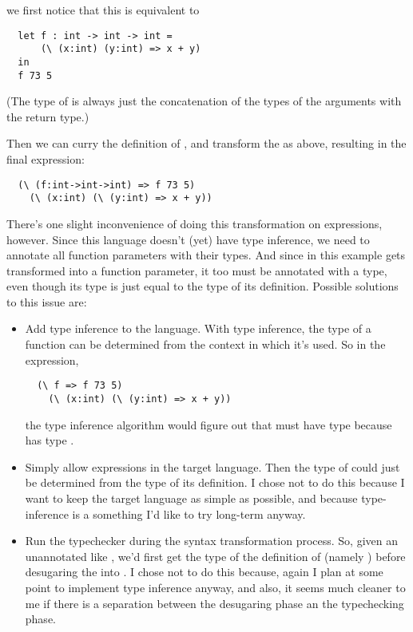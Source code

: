 \message{ !name(report.tex)}\documentclass[pageno]{jpaper}
\begin{document}
{{{\begin{itemize}
we first notice that this is equivalent to

\begin{lstlisting}
  let f : int -> int -> int =
      (\ (x:int) (y:int) => x + y)
  in
  f 73 5
\end{lstlisting}

(The type of  is always just the concatenation of the types of the arguments with the return type.)

Then we can curry the definition of , and transform the  as above, resulting in
the final expression:

\begin{lstlisting}
  (\ (f:int->int->int) => f 73 5)
    (\ (x:int) (\ (y:int) => x + y))
\end{lstlisting}
\end{itemize}

There's one slight inconvenience of doing this transformation on  expressions, however.
Since this language doesn't (yet) have type inference, we need to annotate all function parameters
with their types. And since  in this example gets transformed into a function parameter,
it too must be annotated with a type, even though its type is just equal to the type of its definition.
Possible solutions to this issue are:

\begin{itemize}
\item Add type inference to the language. With type inference, the type of a function
can be determined from the context in which it's used. So in the expression,

\begin{lstlisting}
  (\ f => f 73 5)
    (\ (x:int) (\ (y:int) => x + y))
\end{lstlisting}

the type inference algorithm would figure out that  must have type  because
 has type .
\item Simply allow  expressions in the target language.  Then the type of  could
just be determined from the type of its definition. I chose not to do this because I want to keep the
target language as simple as possible, and because type-inference is a something I'd like to try long-term
anyway.

\item Run the typechecker during the syntax transformation process. So, given an unannotated 
like , we'd first get the type of the definition of  (namely )
before desugaring the  into . I chose not to do this because, again I plan at some point to implement type inference
anyway, and also, it seems much cleaner to me if there is a separation between the desugaring phase an the
typechecking phase.
\end{itemize}

}}}
\end{document}
